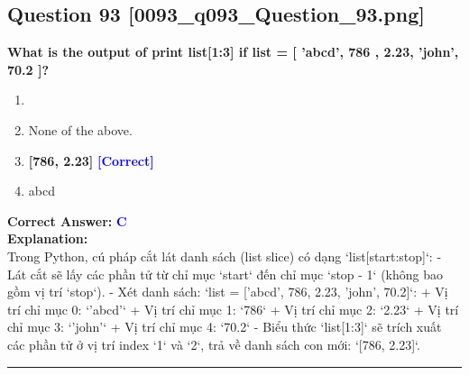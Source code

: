 \documentclass[11pt,a4paper]{article}
\begin{document}
\begin{minipage}{\textwidth}
\subsection*{Question 93 \quad \footnotesize{[0093_q093_Question_93.png]}}
\noindent \textbf{What is the output of print list[1:3] if list = [ 'abcd', 786 , 2.23, 'john', 70.2 ]?}

\begin{enumerate}[label=\Alph*.]
    \item [ 'abcd', 786 , 2.23, 'john', 70.2 ]
    \item None of the above.
    \item \textbf{[786, 2.23]} \hfill \textcolor{blue}{\textbf{[Correct]}}
    \item abcd
\end{enumerate}

\noindent \textbf{Correct Answer:} \textcolor{blue}{\textbf{C}} \\[4pt]
\noindent \textbf{Explanation:}\\
Trong Python, cú pháp cắt lát danh sách (list slice) có dạng `list[start:stop]`:\newline
- Lát cắt sẽ lấy các phần tử từ chỉ mục `start` đến chỉ mục `stop - 1` (không bao gồm vị trí `stop`).\newline
- Xét danh sách: `list = ['abcd', 786, 2.23, 'john', 70.2]`:\newline
  + Vị trí chỉ mục 0: `'abcd'`\newline
  + Vị trí chỉ mục 1: `786`\newline
  + Vị trí chỉ mục 2: `2.23`\newline
  + Vị trí chỉ mục 3: `'john'`\newline
  + Vị trí chỉ mục 4: `70.2`\newline
- Biểu thức `list[1:3]` sẽ trích xuất các phần tử ở vị trí index `1` và `2`, trả về danh sách con mới: `[786, 2.23]`.
\end{minipage}
\vspace{0.8cm}
\hrule
\vspace{0.5cm}
\end{document}
